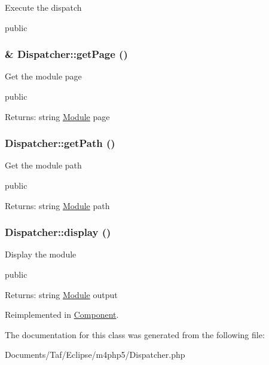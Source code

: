 Execute the dispatch

public \hypertarget{classDispatcher_b24e375f54413076199f58d15bfc16f3}{
\subsubsection[getPage]{\setlength{\rightskip}{0pt plus 5cm}\& Dispatcher::getPage ()}}
\label{classDispatcher_b24e375f54413076199f58d15bfc16f3}


Get the module page

public \begin{Desc}
\item[Returns:]string \hyperlink{classModule}{Module} page \end{Desc}
\hypertarget{classDispatcher_46f96056b66e4b5c9536d19148cf9774}{
\subsubsection[getPath]{\setlength{\rightskip}{0pt plus 5cm}Dispatcher::getPath ()}}
\label{classDispatcher_46f96056b66e4b5c9536d19148cf9774}


Get the module path

public \begin{Desc}
\item[Returns:]string \hyperlink{classModule}{Module} path \end{Desc}
\hypertarget{classDispatcher_92a054ab35b0d91267d80da16d53ef9e}{
\subsubsection[display]{\setlength{\rightskip}{0pt plus 5cm}Dispatcher::display ()}}
\label{classDispatcher_92a054ab35b0d91267d80da16d53ef9e}


Display the module

public \begin{Desc}
\item[Returns:]string \hyperlink{classModule}{Module} output \end{Desc}


Reimplemented in \hyperlink{classComponent_0a0409f0dc2092c2aa383123f98ca09c}{Component}.

The documentation for this class was generated from the following file:\begin{CompactItemize}
\item 
Documents/Taf/Eclipse/m4php5/Dispatcher.php\end{CompactItemize}
